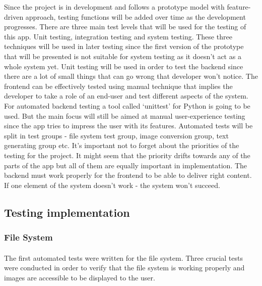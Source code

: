 \documentclass[12pt]{report}
\begin{document}
    Since the project is in development and follows a prototype model with feature-driven approach, testing functions will be added over time as the development progresses. There are three main test levels that will be used for the testing of this app.
    Unit testing, integration testing and system testing. These three techniques will be used in later testing since the first version of the prototype that will be presented is not suitable for system testing as it doesn't act as a whole system yet.
    Unit testing will be used in order to test the backend since there are a lot of small things that can go wrong that developer won't notice. The frontend can be effectively tested using manual technique that implies the developer to take a role of an end-user and test different aspects of the system.
    For automated backend testing a tool called `unittest' for Python is going to be used. But the main focus will still be aimed at manual user-experience testing since the app tries to impress the user with its features. Automated tests will be split in test groups - file system test group, image conversion group, text generating group etc.
    It's important not to forget about the priorities of the testing for the project. It might seem that the priority drifts towards any of the parts of the app but all of them are equally important in implementation. The backend must work properly for the frontend to be able to deliver right content. If one element of the system doesn't work - the system won't succeed.

    \subsection*{Testing implementation}

    \subsubsection*{File System}
    \paragraph{}

    The first automated tests were written for the file system. Three crucial tests were conducted in order to verify that the file system is working properly and images are accessible to be displayed to the user.
\end{document}
